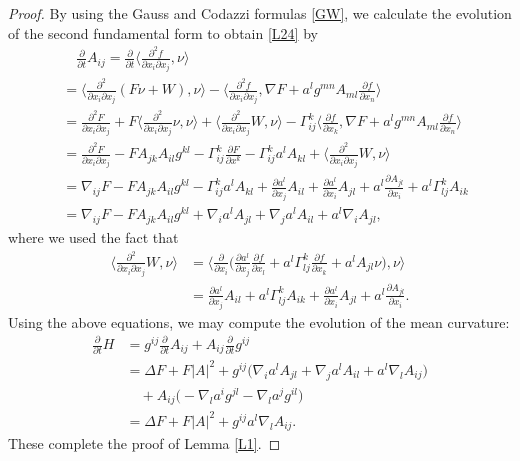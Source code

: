 \documentclass[10pt,a4paper]{amsart}
\begin{document}
\begin{proof}
By using the Gauss  and Codazzi formulas \eqref{GW}, we calculate the evolution of the second fundamental form to obtain \eqref{L24} by
\begin{align}
&\quad \frac{\partial }{\partial t} A_{ij}=\frac{\partial }{\partial
t}\langle \frac{\partial^2
f}{\partial x_i \partial x_j}, \nu\rangle\nonumber\\
&=\langle \frac{\partial^2 }{\partial x_i \partial
x_j}(F\nu+W), \nu\rangle-\langle \frac{\partial^2 f}{\partial
x_i \partial x_j}, \nabla F+a^l g^{mn}A_{ml}\frac{\partial f}{\partial x_n}\rangle \nonumber\\
&=\frac{\partial^2 F}{\partial x_i \partial x_j}+F\langle
\frac{\partial^2 }{\partial x_i \partial x_j}\nu, \nu\rangle+\langle
\frac{\partial^2 }{\partial x_i \partial x_j}W,
\nu\rangle-\Gamma_{ij}^k\langle \frac{\partial f}{\partial x_k},
\nabla F+a^l g^{mn}A_{ml}\frac{\partial f}{\partial
x_n}\rangle\nonumber\\
&=\frac{\partial^2 F}{\partial x_i \partial
x_j}-F A_{jk}A_{il}g^{kl}-\Gamma_{ij}^k\frac{\partial F}{\partial x^k}-\Gamma_{ij}^k
a^lA_{kl}+ \langle \frac{\partial^2
}{\partial x_i \partial x_j}W, \nu\rangle\nonumber \\
&=\nabla_{ij}F-F A_{jk}A_{il}g^{kl}-\Gamma_{ij}^k
a^lA_{kl}+\frac{\partial a^l}{\partial x_j}A_{il}+\frac{\partial
a^l}{\partial x_i}A_{jl}+a^l\frac{\partial
 A_{jl}}{\partial x_i}+ a^l\Gamma_{lj}^k A_{ik}\nonumber\\
&=\nabla_{ij}F-F A_{jk}A_{il}g^{kl}+\nabla_i
a^lA_{jl}+\nabla_j a^lA_{il}+a^l\nabla_i A_{jl}, \nonumber
\end{align}
 where we used the fact that
\begin{align}
\langle \frac{\partial^2 }{\partial x_i \partial x_j}W,
\nu\rangle
&=\langle\frac{\partial }{\partial x_i}\Big(\frac{\partial
a^l}{\partial x_j}\frac{\partial f}{\partial
x_l}+a^l\Gamma_{lj}^k\frac{\partial f}{\partial
x_k}+a^lA_{jl}\nu\Big),\nu \rangle\nonumber\\
&=\frac{\partial a^l}{\partial x_j}A_{il}+ a^l\Gamma_{lj}^k
A_{ik}+\frac{\partial a^l}{\partial x_i}A_{jl}+a^l\frac{\partial
 A_{jl}}{\partial x_i}\nonumber.
\end{align}
Using the above equations, we may compute the evolution of the mean
curvature:
\begin{align}
\frac{\partial }{\partial t}H&=g^{ij}\frac{\partial }{\partial t}A_{ij}+
A_{ij}\frac{\partial }{\partial t}g^{ij}\nonumber\\
&=\Delta F +F \vert A\vert ^2+ g^{ij}\big (\nabla_i a^lA_{jl}+\nabla_j a^lA_{il}+a^l\nabla_l A_{ij} \big)\nonumber\\
&\quad+A_{ij}\big(-\nabla_l a^i g^{jl}-\nabla_l a^jg^{il}\big)\nonumber\\
&=\Delta F +F \vert A\vert ^2+g^{ij}a^l\nabla_l
A_{ij}.\nonumber
\end{align}
These complete the proof of Lemma \ref{L1}.
\end{proof}
\end{document}
